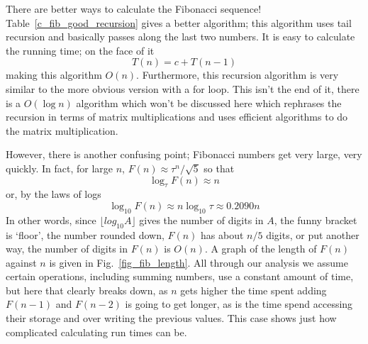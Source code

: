 \documentclass[11pt,a4paper]{scrartcl}
\begin{document}
There are better ways to calculate the Fibonacci sequence!
Table~\ref{c_fib_good_recursion} gives a better algorithm; this
algorithm uses tail recursion and basically passes along the last two
numbers. It is easy to calculate the running time; on the face of it
\begin{equation}
T(n)=c+T(n-1)
\end{equation}
making this algorithm $O(n)$. Furthermore, this recursion algorithm is
very similar to the more obvious version with a for loop. This isn't
the end of it, there is a $O(\log{n})$ algorithm which won't be
discussed here which rephrases the recursion in terms of matrix
multiplications and uses efficient algorithms to do the matrix
multiplication. 

However, there is another confusing point; Fibonacci numbers get very
large, very quickly. In fact, for large $n$, $F(n)\approx
\tau^n/\sqrt{5}$ so that
\begin{equation}
\log_\tau F(n)\approx n
\end{equation}
or, by the laws of logs
\begin{equation}
\log_{10} F(n) \approx n\log_{10}\tau \approx 0.2090 n
\end{equation}
In other words, since $\lfloor log_{10} A\rfloor$ gives the number of
digits in $A$, the funny bracket is \lq{}floor\rq{}, the number
rounded down, $F(n)$ has about $n/5$ digits, or put another way, the
number of digits in $F(n)$ is $O(n)$. A graph of the length of $F(n)$
against $n$ is given in Fig.~\ref{fig_fib_length}. All through our
analysis we assume certain operations, including summing numbers, use
a constant amount of time, but here that clearly breaks down, as $n$
gets higher the time spent adding $F(n-1)$ and $F(n-2)$ is going to
get longer, as is the time spend accessing their storage and over
writing the previous values. This case shows just how complicated
calculating run times can be.
\end{document}

